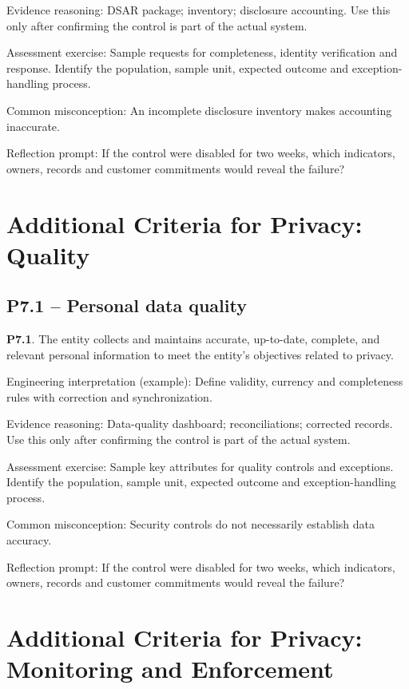 \documentclass[10pt,oneside]{report}
\begin{document}
Evidence reasoning: DSAR package; inventory; disclosure accounting. Use this only after confirming the control is part of the actual system.

Assessment exercise: Sample requests for completeness, identity verification and response. Identify the population, sample unit, expected outcome and exception-handling process.

Common misconception: An incomplete disclosure inventory makes accounting inaccurate.

Reflection prompt: If the control were disabled for two weeks, which indicators, owners, records and customer commitments would reveal the failure?

\section{Additional Criteria for Privacy: Quality}
\subsection{P7.1 -- Personal data quality}
\begin{aicpabox}
\textbf{P7.1}. The entity collects and maintains accurate, up-to-date, complete, and relevant personal information to meet the entity's objectives related to privacy.\par{}
\end{aicpabox}
Engineering interpretation (example): Define validity, currency and completeness rules with correction and synchronization.

Evidence reasoning: Data-quality dashboard; reconciliations; corrected records. Use this only after confirming the control is part of the actual system.

Assessment exercise: Sample key attributes for quality controls and exceptions. Identify the population, sample unit, expected outcome and exception-handling process.

Common misconception: Security controls do not necessarily establish data accuracy.

Reflection prompt: If the control were disabled for two weeks, which indicators, owners, records and customer commitments would reveal the failure?

\section{Additional Criteria for Privacy: Monitoring and Enforcement}
\end{document}
